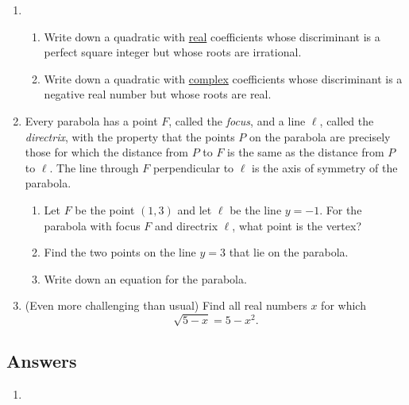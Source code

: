 \begin{enumerate}[resume]
\item \begin{enumerate}
\item Write down a quadratic with \underline{real} coefficients whose discriminant is a perfect square integer but whose roots are irrational.
\item Write down a quadratic with \underline{complex} coefficients whose discriminant is a negative real number but whose roots are real.
\end{enumerate}
\item Every parabola has a point $F$, called the \emph{focus}, and a line $\ell$, called the \emph{directrix}, with the property that the points $P$ on the parabola are precisely those for which the distance from $P$ to $F$ is the same as the distance from $P$ to $\ell$. The line through $F$ perpendicular to $\ell$ is the axis of symmetry of the parabola.
\begin{enumerate}
\item Let $F$ be the point $(1,3)$ and let $\ell$ be the line $y = -1$. For the parabola with focus $F$ and directrix $\ell$, what point is the vertex?
\item Find the two points on the line $y = 3$ that lie on the parabola.
\item Write down an equation for the parabola.
\end{enumerate}
\item (Even more challenging than usual) Find all real numbers $x$ for which
\begin{equation*}
\sqrt{5 - x} = 5 - x^2.
\end{equation*}
\end{enumerate}


\newpage
\subsection{Answers}

\begin{enumerate}
\item 
\end{enumerate}